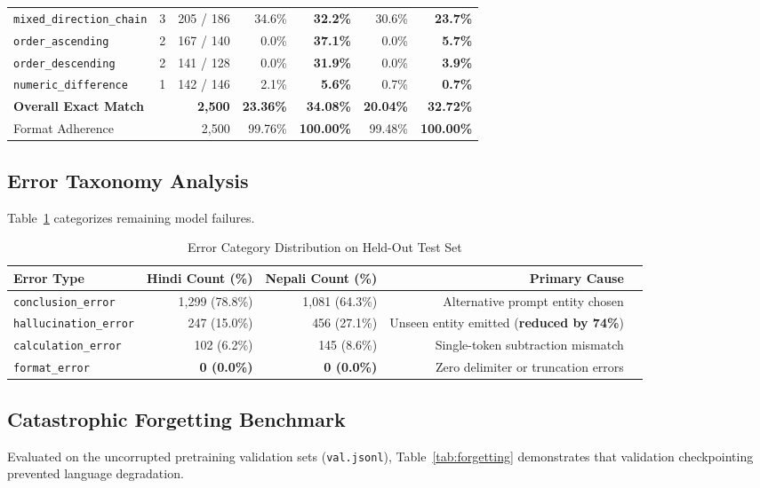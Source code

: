 \documentclass[11pt,a4paper]{article}
\begin{document}
\begin{table}[H]
\begin{tabular}{@{}lcrrrrr@{}}
\texttt{mixed\_direction\_chain} & 3 & 205 / 186 & 34.6\% & \textbf{32.2\%} & 30.6\% & \textbf{23.7\%} \\
\texttt{order\_ascending} & 2 & 167 / 140 & 0.0\% & \textbf{37.1\%} & 0.0\% & \textbf{5.7\%} \\
\texttt{order\_descending} & 2 & 141 / 128 & 0.0\% & \textbf{31.9\%} & 0.0\% & \textbf{3.9\%} \\
\texttt{numeric\_difference} & 1 & 142 / 146 & 2.1\% & \textbf{5.6\%} & 0.7\% & \textbf{0.7\%} \\
\midrule
\textbf{Overall Exact Match} & & \textbf{2,500} & \textbf{23.36\%} & \textbf{34.08\%} & \textbf{20.04\%} & \textbf{32.72\%} \\
Format Adherence & & 2,500 & 99.76\% & \textbf{100.00\%} & 99.48\% & \textbf{100.00\%} \\
\bottomrule
\end{tabular}
\end{table}

\subsection{Error Taxonomy Analysis}
Table~\ref{tab:error_taxonomy} categorizes remaining model failures.

\begin{table}[H]
\centering
\small
\caption{Error Category Distribution on Held-Out Test Set}
\label{tab:error_taxonomy}
\begin{tabular}{@{}lrrrl@{}}
\toprule
\textbf{Error Type} & \textbf{Hindi Count (\%)} & \textbf{Nepali Count (\%)} & \textbf{Primary Cause} \\
\midrule
\texttt{conclusion\_error} & 1,299 (78.8\%) & 1,081 (64.3\%) & Alternative prompt entity chosen \\
\texttt{hallucination\_error} & 247 (15.0\%) & 456 (27.1\%) & Unseen entity emitted (\textbf{reduced by 74\%}) \\
\texttt{calculation\_error} & 102 (6.2\%) & 145 (8.6\%) & Single-token subtraction mismatch \\
\texttt{format\_error} & \textbf{0 (0.0\%)} & \textbf{0 (0.0\%)} & Zero delimiter or truncation errors \\
\bottomrule
\end{tabular}
\end{table}

\subsection{Catastrophic Forgetting Benchmark}
Evaluated on the uncorrupted pretraining validation sets (\texttt{val.jsonl}), Table~\ref{tab:forgetting} demonstrates that validation checkpointing prevented language degradation.
\end{document}
